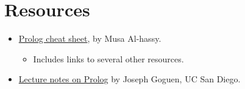 \documentclass[11pt]{article}
\begin{document}
\section{Resources}
\label{sec:orgcbc96e8}
\begin{itemize}
\item \href{https://github.com/alhassy/PrologCheatSheet}{Prolog cheat sheet},
by Musa Al-hassy.
\begin{itemize}
\item Includes links to several other resources.
\end{itemize}
\item \href{https://cseweb.ucsd.edu/\~goguen/courses/130w04/prolog.html}{Lecture notes on Prolog}
by Joseph Goguen, UC San Diego.
\end{itemize}
\end{document}

